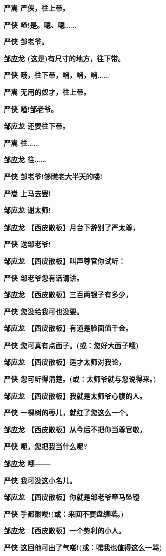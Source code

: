 \textbf{严嵩 严侠，往上带。}

\textbf{严侠 喳!是。嗯、嗯\ldots{}\ldots{}}

\textbf{严侠 邹老爷。}

\textbf{邹应龙 (这是)有尺寸的地方，往下带。}

\textbf{严侠 哦，往下带，哨，哨，哨\ldots{}\ldots{}}

\textbf{严嵩 无用的奴才，往上带。}

\textbf{严侠 喳!邹老爷。}

\textbf{邹应龙 还要往下带。}

\textbf{严嵩 往\ldots{}\ldots{}}

\textbf{邹应龙 往\ldots{}\ldots{}}

\textbf{严侠 邹老爷!够瞧老大半天的喽!}

\textbf{严嵩 上马去罢!}

\textbf{邹应龙 谢太师!}

\textbf{邹应龙 【西皮散板】月台下辞别了严太尊，}

\textbf{严侠 送邹老爷!}

\textbf{邹应龙 【西皮散板】叫声尊官你试听：}

\textbf{严侠 邹老爷您有话请讲。}

\textbf{邹应龙 【西皮散板】三百两银子有多少，}

\textbf{严侠 您没给我可也没要。}

\textbf{邹应龙 【西皮散板】有道是脸面值千金。}

\textbf{严侠 您可真有点面子。(或：您好大面子哦)}

\textbf{邹应龙 【西皮散板】适才太师对我论，}

\textbf{严侠 您可听得清楚。(或：太师爷就与您说得来。)}

\textbf{邹应龙 【西皮散板】我就是太师爷心腹的人。}

\textbf{严侠 一棵树的枣儿，就红了您这么一个。}

\textbf{邹应龙 【西皮散板】从今后不把你当尊官敬，}

\textbf{严侠 呃，您把我当什么呢?}

\textbf{邹应龙 哦------}

\textbf{严侠 我可没这小名儿。}

\textbf{邹应龙 【西皮散板】你就是邹老爷牵马坠镫------}

\textbf{严侠 手都酸喽!(或：来回不要盘缠喏。)}

\textbf{邹应龙 【西皮散板】一个势利的小人。}

\textbf{严侠 这回他可出了气喽!(或：嘿我也值得这么一骂)}

